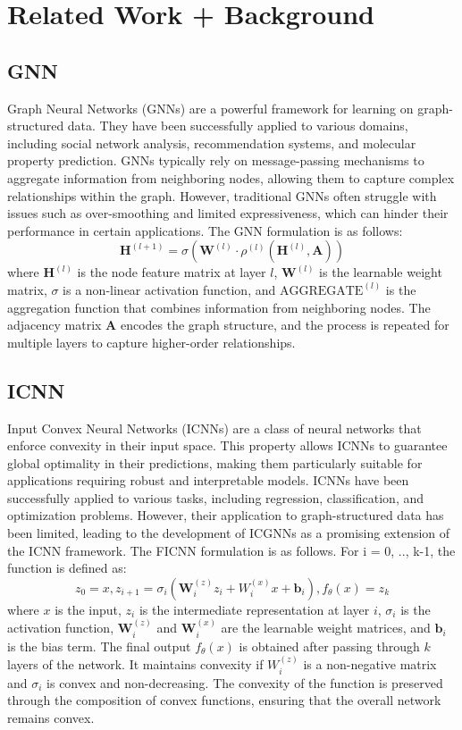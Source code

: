 \documentclass{article} %
\begin{document}
\section{Related Work + Background}
\subsection{GNN}
Graph Neural Networks (GNNs) are a powerful framework for learning on graph-structured data. They have been successfully applied to various domains, including social network analysis, recommendation systems, and molecular property prediction. GNNs typically rely on message-passing mechanisms to aggregate information from neighboring nodes, allowing them to capture complex relationships within the graph. However, traditional GNNs often struggle with issues such as over-smoothing and limited expressiveness, which can hinder their performance in certain applications.
The GNN formulation is as follows:
\begin{equation}
    \mathbf{H}^{(l+1)} = \sigma\left(\mathbf{W}^{(l)} \cdot \rho^{(l)}\left(\mathbf{H}^{(l)}, \mathbf{A}\right)\right)
\end{equation}
where $\mathbf{H}^{(l)}$ is the node feature matrix at layer $l$, $\mathbf{W}^{(l)}$ is the learnable weight matrix, $\sigma$ is a non-linear activation function, and $\text{AGGREGATE}^{(l)}$ is the aggregation function that combines information from neighboring nodes. The adjacency matrix $\mathbf{A}$ encodes the graph structure, and the process is repeated for multiple layers to capture higher-order relationships.
\subsection{ICNN}
Input Convex Neural Networks (ICNNs) are a class of neural networks that enforce convexity in their input space. This property allows ICNNs to guarantee global optimality in their predictions, making them particularly suitable for applications requiring robust and interpretable models. ICNNs have been successfully applied to various tasks, including regression, classification, and optimization problems. However, their application to graph-structured data has been limited, leading to the development of ICGNNs as a promising extension of the ICNN framework.
The FICNN formulation is as follows. For i = 0, .., k-1, the function is defined as:
\begin{equation}
    z_0 = x, z_{i+1} = \sigma_i \left(\mathbf{W}^{(z)}_i z_i  + W_i^{(x)}x+ \mathbf{b}_i\right), f_\theta(x) = z_k
\end{equation}
where $x$ is the input, $z_i$ is the intermediate representation at layer $i$, $\sigma_i$ is the activation function, $\mathbf{W}^{(z)}_i$ and $\mathbf{W}^{(x)}_i$ are the learnable weight matrices, and $\mathbf{b}_i$ is the bias term. The final output $f_\theta(x)$ is obtained after passing through $k$ layers of the network.
It maintains convexity if $W_i^{(z)}$ is a non-negative matrix and $\sigma_i$ is convex and non-decreasing. The convexity of the function is preserved through the composition of convex functions, ensuring that the overall network remains convex.
\end{document}

